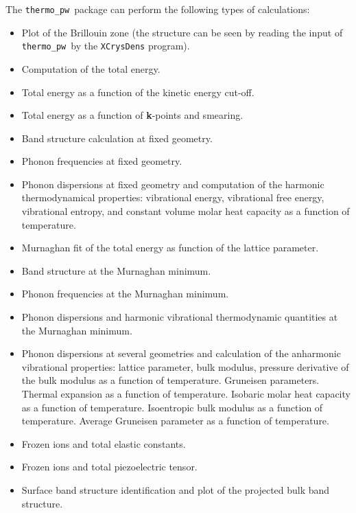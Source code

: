 \documentclass[12pt,a4paper]{article}
\def\thermo{\texttt{thermo\_pw}}
\begin{document}
The \thermo\ package can perform the following types of calculations:
\begin{itemize}
\item Plot of the Brillouin zone (the structure can be seen by reading the
input of \thermo\ by the \texttt{XCrysDens} program).

\item Computation of the total energy.

\item Total energy as a function of the kinetic energy cut-off.

\item Total energy as a function of {\bf k}-points and smearing.

\item Band structure calculation at fixed geometry.

\item Phonon frequencies at fixed geometry.

\item Phonon dispersions at fixed geometry and computation of the harmonic
thermodynamical properties: vibrational energy, vibrational free energy,
vibrational entropy, and constant volume molar heat capacity as a function
of temperature.

\item Murnaghan fit of the total energy as function of the lattice parameter.

\item Band structure at the Murnaghan minimum.

\item Phonon frequencies at the Murnaghan minimum.

\item Phonon dispersions and harmonic vibrational thermodynamic quantities
at the Murnaghan minimum.

\item Phonon dispersions at several geometries and calculation of the
anharmonic vibrational properties: lattice parameter, bulk modulus,
pressure derivative of the bulk modulus as a function of temperature.
Gruneisen parameters. Thermal expansion as a function of temperature.
Isobaric molar heat capacity as a function of temperature.
Isoentropic bulk modulus as a function of temperature.
Average Gruneisen parameter as a function of temperature.

\item Frozen ions and total elastic constants.

\item Frozen ions and total piezoelectric tensor.

\item Surface band structure identification and plot of the projected bulk
band structure.
\end{itemize}
\end{document}
